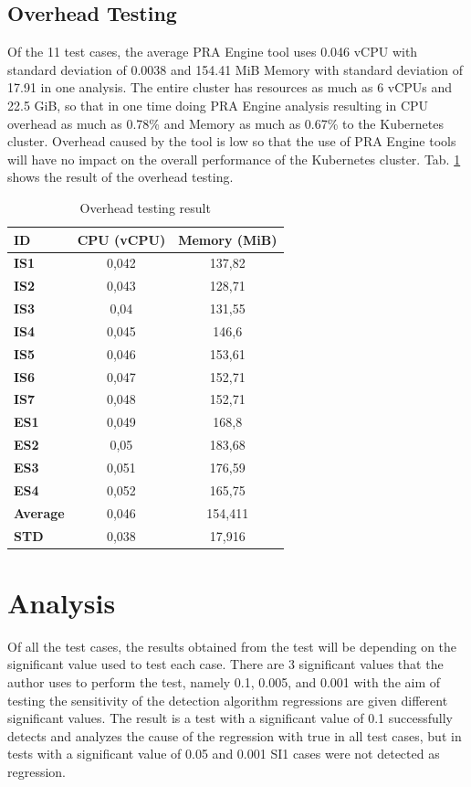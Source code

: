 \documentclass[conference]{configs/IEEEtran}
\begin{document}
\subsection{Overhead Testing}
Of the 11 test cases, the average PRA Engine tool uses 0.046
vCPU with standard deviation of 0.0038 and 154.41 MiB Memory with standard
deviation of 17.91 in one analysis. The entire cluster has resources
as much as 6 vCPUs and 22.5 GiB, so that in one time doing PRA Engine analysis
resulting in CPU overhead as much as 0.78\% and Memory as much as 0.67\% to the Kubernetes cluster. Overhead caused by the tool is low so that the use of PRA Engine tools will have no impact on the overall performance of the Kubernetes cluster. Tab. \ref{overhead-tbl} shows the result of the overhead testing.
\begin{table}[!htb]
	\caption{Overhead testing result}
	\label{overhead-tbl}
	\centering
	\begin{tabular}{|l|c|c|}
		\hline
		\multicolumn{1}{|l|}{ID} & \multicolumn{1}{l|}{CPU (vCPU)} & \multicolumn{1}{l|}{Memory (MiB)} \\ \hline
		\textbf{IS1}     & 0,042 & 137,82  \\ \hline
		\textbf{IS2}     & 0,043 & 128,71  \\ \hline
		\textbf{IS3}     & 0,04  & 131,55  \\ \hline
		\textbf{IS4}     & 0,045 & 146,6   \\ \hline
		\textbf{IS5}     & 0,046 & 153,61  \\ \hline
		\textbf{IS6}     & 0,047 & 152,71  \\ \hline
		\textbf{IS7}     & 0,048 & 152,71  \\ \hline
		\textbf{ES1}     & 0,049 & 168,8   \\ \hline
		\textbf{ES2}     & 0,05  & 183,68  \\ \hline
		\textbf{ES3}     & 0,051 & 176,59  \\ \hline
		\textbf{ES4}     & 0,052 & 165,75  \\ \hline
		\textbf{Average} & 0,046 & 154,411 \\ \hline
		\textbf{STD}     & 0,038 & 17,916  \\ \hline
	\end{tabular}
\end{table}
%
\section{Analysis}
Of all the test cases, the results obtained from the test will be
depending on the significant value used to test each case.
There are 3 significant values that the author uses to perform the test, namely 0.1, 0.005, and 0.001 with the aim of testing the sensitivity of the detection algorithm regressions are given different significant values. The result is a test with
a significant value of 0.1 successfully detects and analyzes the cause of the regression with true in all test cases, but in tests with a significant value of 0.05 and 0.001 SI1 cases were not detected as regression.
\end{document}
